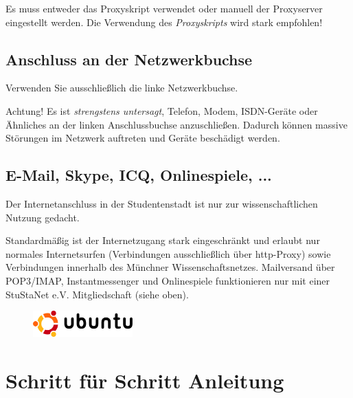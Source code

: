 \documentclass[a4paper,12pt,draft]{scrartcl}
\begin{document}
Es muss entweder das Proxyskript verwendet oder manuell der Proxyserver eingestellt werden. Die Verwendung des \emph{Proxyskripts} wird stark empfohlen!

\subsection*{Anschluss an der Netzwerkbuchse}

Verwenden Sie ausschließlich die linke Netzwerkbuchse. 

Achtung! Es ist \emph{strengstens untersagt}, Telefon, Modem, ISDN-Geräte oder Ähnliches an der linken Anschlussbuchse anzuschließen. Dadurch können massive Störungen im Netzwerk auftreten und Geräte beschädigt werden. 

\subsection*{E-Mail, Skype, ICQ, Onlinespiele, ...}

Der Internetanschluss in der Studentenstadt ist nur zur wissenschaftlichen Nutzung gedacht.

Standardmäßig ist der Internetzugang stark eingeschränkt und erlaubt nur normales Internetsurfen (Verbindungen ausschließlich über http-Proxy) sowie Verbindungen innerhalb des Münchner Wissenschaftsnetzes. Mailversand über POP3/IMAP, Instantmessenger und Onlinespiele funktionieren nur mit einer StuStaNet e.V. Mitgliedschaft (siehe oben).


\newpage
\enlargethispage{20pt}

\begin{figure}[t!]
    \raggedleft
    \vspace{-20pt}
    \includegraphics[height=1cm,keepaspectratio]{Bilder/Ubuntu_logo}
    \vspace{-20pt}
\end{figure}

\section*{Schritt für Schritt Anleitung}
\end{document}
